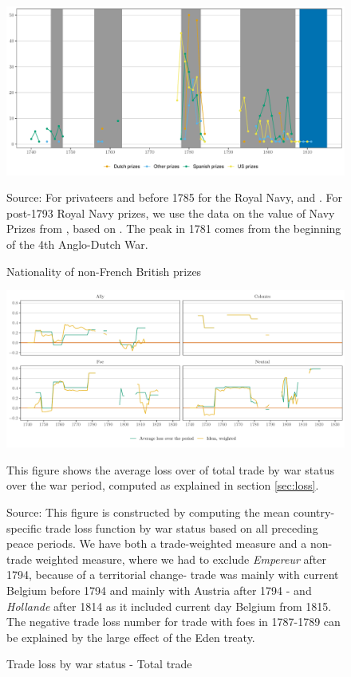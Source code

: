 \documentclass[12pt,a4paper,notitlepage,english]{article}
\newcommand{\fontsmall}{\fontsize{10pt}{12pt}\selectfont}
\newcommand{\source}[1]{\caption*{\footnotesize Source: {#1}} }
\begin{document}
\begin{appendix}
\begin{figure}[h!]
\caption{Nationality of non-French British prizes}
\label{fig:prizes_nationality}
\begin{minipage}{0.9\textwidth}
\centering
\includegraphics[scale=.8]{Prizes_nationality}
\source{For privateers and before 1785 for the Royal Navy, \cite{Starkey1990} and \cite{Hillmann2011}. For post-1793 Royal Navy prizes, we use the data on the value of Navy Prizes from \cite{Benjamin2009}, based on \cite{Hill1998}.
The peak in 1781 comes from the beginning of the 4th Anglo-Dutch War. }
\end{minipage}
\end{figure}

\begin{figure}[h!]
\centering
\caption{Trade loss by war status - Total trade}
\label{fig:loss_by_war_status_XI}
\includegraphics[scale=.17]{loss_by_war_status_XI}
\begin{minipage}{.95\textwidth}
\fontsmall 
This figure shows the average loss over of total trade by war status over the war period, computed as explained in section \ref{sec:loss}. 
\source{This figure is constructed by computing the mean country-specific trade loss function by war status based on all preceding peace periods.
We have both a trade-weighted measure and a non-trade weighted measure, where we had to exclude \textit{Empereur} after 1794, because of a territorial change- trade was mainly with current Belgium before 1794 and mainly with Austria after 1794 - and \textit{Hollande} after 1814 as it included current day Belgium from 1815.
The negative trade loss number for trade with foes in 1787-1789 can be explained by the large effect of the Eden treaty.}
\end{minipage}
\end{figure}


\end{appendix}
\end{document}
